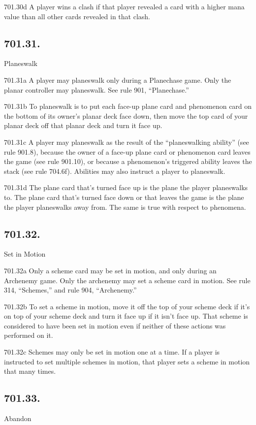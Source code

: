 701.30d A player wins a clash if that player revealed a card with a higher mana value than all other cards revealed in that clash.

\subsection*{701.31.}
Planeswalk

701.31a A player may planeswalk only during a Planechase game. Only the planar controller may planeswalk. See rule 901, “Planechase.”

701.31b To planeswalk is to put each face-up plane card and phenomenon card on the bottom of its owner’s planar deck face down, then move the top card of your planar deck off that planar deck and turn it face up.

701.31c A player may planeswalk as the result of the “planeswalking ability” (see rule 901.8), because the owner of a face-up plane card or phenomenon card leaves the game (see rule 901.10), or because a phenomenon’s triggered ability leaves the stack (see rule 704.6f). Abilities may also instruct a player to planeswalk.

701.31d The plane card that’s turned face up is the plane the player planeswalks to. The plane card that’s turned face down or that leaves the game is the plane the player planeswalks away from. The same is true with respect to phenomena.

\subsection*{701.32.}
Set in Motion

701.32a Only a scheme card may be set in motion, and only during an Archenemy game. Only the archenemy may set a scheme card in motion. See rule 314, “Schemes,” and rule 904, “Archenemy.”

701.32b To set a scheme in motion, move it off the top of your scheme deck if it’s on top of your scheme deck and turn it face up if it isn’t face up. That scheme is considered to have been set in motion even if neither of these actions was performed on it.

701.32c Schemes may only be set in motion one at a time. If a player is instructed to set multiple schemes in motion, that player sets a scheme in motion that many times.

\subsection*{701.33.}
Abandon

